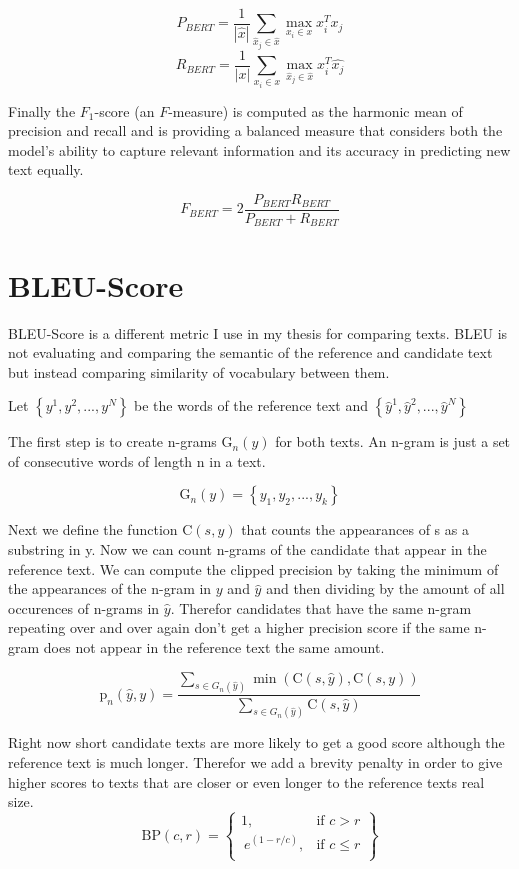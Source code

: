 \[P_{BERT} = \frac{1}{|\hat{x}|} \sum_{\hat{x}_j\in \hat{x}} \max_{x_i \in x} x_i^T \hat{x_j} \]
\[R_{BERT} = \frac{1}{|x|} \sum_{x_i \in x} \max_{\hat{x}_j\in \hat{x}} x_i^T \hat{x_j} \]



Finally the $F_1$-score (an $F$-measure)
is computed as the harmonic mean of precision and recall and is providing a balanced measure that considers both the model's ability to capture relevant information and its accuracy in predicting new text equally.

\[F_{BERT} = 2\frac{P_{BERT}R_{BERT}}{P_{BERT} + R_{BERT}} \]

\section{BLEU-Score}

BLEU-Score is a different metric I use in my thesis for comparing texts. BLEU is not evaluating and comparing the semantic of the reference and candidate text but instead comparing similarity of vocabulary between them.

Let $\left\{y^{1}, y^{2}, ..., y^{N}\right\}$ be the words of the reference text and $\left\{\hat{y}^{1}, \hat{y}^{2}, ..., \hat{y}^{N}\right\}$


The first step is to create n-grams $\text{G}_n(y)$ for both texts. An n-gram is just a set of consecutive words of length n in a text.

\[
    \text{G}_n(y) = \left\{y_1, y_2, ..., y_k\right\}
\]

Next we define the function $\text{C}(s,y)$ that counts the appearances of s as a substring in y.
Now we can count n-grams of the candidate that appear in the reference text. We can compute the clipped precision by taking the minimum of the appearances of the n-gram in $y$ and $\hat{y}$ and then dividing by the amount of all occurences of n-grams in $\hat{y}$. Therefor candidates that have the same n-gram repeating over and over again don't get a higher precision score if the same n-gram does not appear in the reference text the same amount.

\[
    \text{p}_n(\hat{y} , y) = \frac{\sum_{s \in G_n(\hat{y})} \min(\text{C}(s,\hat{y}), \text{C}(s,y))}{\sum_{s \in G_n(\hat{y})} \text{C}(s,\hat{y})}
\]


Right now short candidate texts are more likely to get a good score although the reference text is much longer. Therefor we add a brevity penalty in order to give higher scores to texts that are closer or even longer to the reference texts real size.
\[
    \text{BP}(c, r) = \left\{\begin{array}{lr}
        1,               & \text{if } c > r    \\
        \ e^{(1 - r/c)}, & \text{if } c \leq r \\
    \end{array}\right\}
\]

